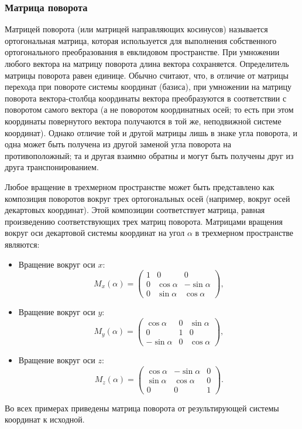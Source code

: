 \subsubsection{Матрица поворота}
Матрицей поворота (или матрицей направляющих косинусов) называется ортогональная матрица,
которая используется для выполнения собственного ортогонального преобразования в евклидовом пространстве.
При умножении любого вектора на матрицу поворота длина вектора сохраняется. Определитель матрицы поворота равен единице.
Обычно считают, что, в отличие от матрицы перехода при повороте системы координат (базиса),
при умножении на матрицу поворота вектора-столбца координаты вектора преобразуются в соответствии с поворотом
самого вектора (а не поворотом координатных осей; то есть при этом координаты повернутого вектора получаются в той же,
неподвижной системе координат). Однако отличие той и другой матрицы лишь в знаке угла поворота,
и одна может быть получена из другой заменой угла поворота на противоположный; та и другая взаимно обратны и могут быть получены
друг из друга транспонированием.

Любое вращение в трехмерном пространстве может быть представлено как композиция поворотов вокруг
трех ортогональных осей (например, вокруг осей декартовых координат).
Этой композиции соответствует матрица, равная произведению соответствующих трех матриц поворота.
Матрицами вращения вокруг оси декартовой системы координат на угол $\alpha$ в трехмерном пространстве являются:
\begin{itemize}
  \item Вращение вокруг оси $x$:
  \begin{equation}
    M_x(\alpha) = \begin{pmatrix} 
		  1 & 0          & 0           \\
		  0 & \cos\alpha & -\sin\alpha \\
		  0 & \sin\alpha & \cos\alpha
		  \end{pmatrix},
  \end{equation}
  
  \item Вращение вокруг оси $y$:
  \begin{equation}  
    M_y(\alpha) = \begin{pmatrix} 
		  \cos\alpha  & 0 & \sin\alpha \\
		  0          & 1 & 0           \\
		 -\sin\alpha & 0 & \cos\alpha
		  \end{pmatrix},
  \end{equation}
  \item Вращение вокруг оси $z$:
  \begin{equation}
    M_z(\alpha) = \begin{pmatrix} 
		  \cos\alpha & -\sin\alpha & 0 \\
		  \sin\alpha & \cos\alpha  & 0 \\
		  0          & 0           & 1
		  \end{pmatrix}.
  \end{equation}
\end{itemize}
Во всех примерах приведены матрица поворота от результирующей системы координат к исходной.
  
